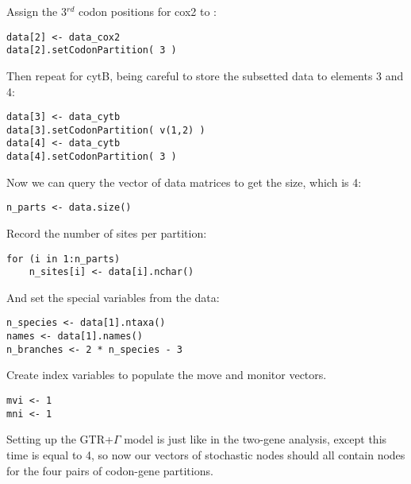 Assign the 3$^{rd}$ codon positions for cox2 to :
{\tt \begin{snugshade*}
\begin{lstlisting}
data[2] <- data_cox2
data[2].setCodonPartition( 3 )
\end{lstlisting}
\end{snugshade*}}

Then repeat for cytB, being careful to store the subsetted data to elements 3 and 4:
{\tt \begin{snugshade*}
\begin{lstlisting}
data[3] <- data_cytb
data[3].setCodonPartition( v(1,2) )
data[4] <- data_cytb
data[4].setCodonPartition( 3 )
\end{lstlisting}
\end{snugshade*}}

Now we can query the vector of data matrices to get the size, which is 4:
{\tt \begin{snugshade*}
\begin{lstlisting}
n_parts <- data.size()
\end{lstlisting}
\end{snugshade*}}

Record the number of sites per partition:
{\tt \begin{snugshade*}
\begin{lstlisting}
for (i in 1:n_parts)
    n_sites[i] <- data[i].nchar()
\end{lstlisting}
\end{snugshade*}}

And set the special variables from the data:
{\tt \begin{snugshade*}
\begin{lstlisting}
n_species <- data[1].ntaxa()
names <- data[1].names()
n_branches <- 2 * n_species - 3
\end{lstlisting}
\end{snugshade*}}

Create index variables to populate the move and monitor vectors.
{\tt \begin{snugshade*}
\begin{lstlisting}
mvi <- 1
mni <- 1
\end{lstlisting}
\end{snugshade*}}

Setting up the GTR+$\Gamma$ model is just like in the two-gene analysis, except this time  is equal to 4, so now our vectors of stochastic nodes should all contain nodes for the four pairs of codon-gene partitions.

